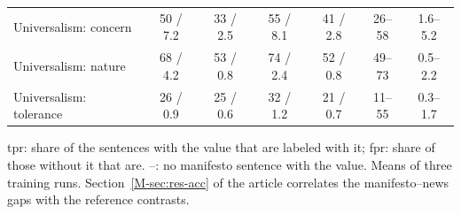 \begin{table}[t]
\begin{tabular*}{\textwidth}{@{\extracolsep{\fill}}lcccccc@{}}
Universalism: concern & 50 / 7.2 & 33 / 2.5 & 55 / 8.1 & 41 / 2.8 & 26--58 & 1.6--5.2 \\
Universalism: nature & 68 / 4.2 & 53 / 0.8 & 74 / 2.4 & 52 / 0.8 & 49--73 & 0.5--2.2 \\
Universalism: tolerance & 26 / 0.9 & 25 / 0.6 & 32 / 1.2 & 21 / 0.7 & 11--55 & 0.3--1.7 \\
\bottomrule
\end{tabular*}
\par\vspace{2pt}
\begin{minipage}{\textwidth}\scriptsize tpr: share of the sentences with the value that are labeled with it; fpr: share of those without it that are. --: no manifesto sentence with the value. Means of three training runs. Section~\ref{M-sec:res-acc} of the article correlates the manifesto--news gaps with the reference contrasts.\end{minipage}
\end{table}
